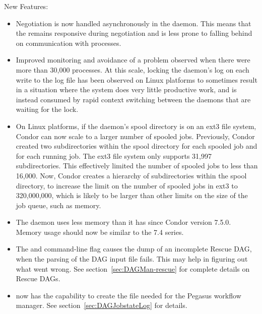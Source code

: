 \noindent New Features:

\begin{itemize}

\item Negotiation is now handled asynchronously in the  daemon.
This means that the  remains responsive during 
negotiation and is less prone to falling behind on communication 
with  processes.

\item Improved monitoring and avoidance of a  problem
observed when there were more than 30,000  processes.
At this scale,
locking the  daemon's log on each write to the log file
has been observed
on Linux platforms to sometimes result in a situation where the system does
very little productive work, and is instead consumed by rapid context
switching between the  daemons that are waiting for the lock.

\item On Linux platforms, if the  daemon's spool directory is
  on an ext3 file system, Condor can now scale to a larger number
  of spooled jobs.  Previously, Condor created two subdirectories
  within the spool directory for each spooled job and for each running
  job.  The ext3 file system only supports 31,997 subdirectories.  This
  effectively limited the number of spooled jobs to less than 16,000.
  Now, Condor creates a hierarchy of subdirectories within
  the spool directory, to increase the limit on the number of spooled jobs
  in ext3 to 320,000,000, which is likely to be larger than other limits
  on the size of the job queue, such as memory.

\item The  daemon uses less memory than it has since 
Condor version 7.5.0.
Memory usage should now be similar to the 7.4 series.

\item The  and  command-line flag
 causes the dump of an incomplete Rescue DAG,
when the parsing of the DAG input file fails.
This may help in figuring out what went wrong.
See section~\ref{sec:DAGMan-rescue} for complete details on Rescue DAGs.

\item {} now has the capability to create the
 file needed for the Pegasus workflow manager.
See section~\ref{sec:DAGJobstateLog} for details.

\end{itemize}

